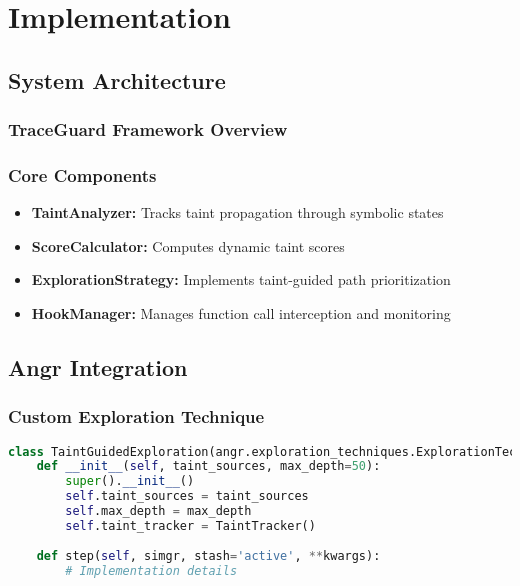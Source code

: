 \chapter{Implementation}


\section{System Architecture}
\subsection{TraceGuard Framework Overview}

\subsection{Core Components}
\begin{itemize}
    \item \textbf{TaintAnalyzer:} Tracks taint propagation through symbolic states
    \item \textbf{ScoreCalculator:} Computes dynamic taint scores
    \item \textbf{ExplorationStrategy:} Implements taint-guided path prioritization
    \item \textbf{HookManager:} Manages function call interception and monitoring
\end{itemize}

\section{Angr Integration}
\subsection{Custom Exploration Technique}
\begin{lstlisting}[language=Python]
class TaintGuidedExploration(angr.exploration_techniques.ExplorationTechnique):
    def __init__(self, taint_sources, max_depth=50):
        super().__init__()
        self.taint_sources = taint_sources
        self.max_depth = max_depth
        self.taint_tracker = TaintTracker()
        
    def step(self, simgr, stash='active', **kwargs):
        # Implementation details
\end{lstlisting}

